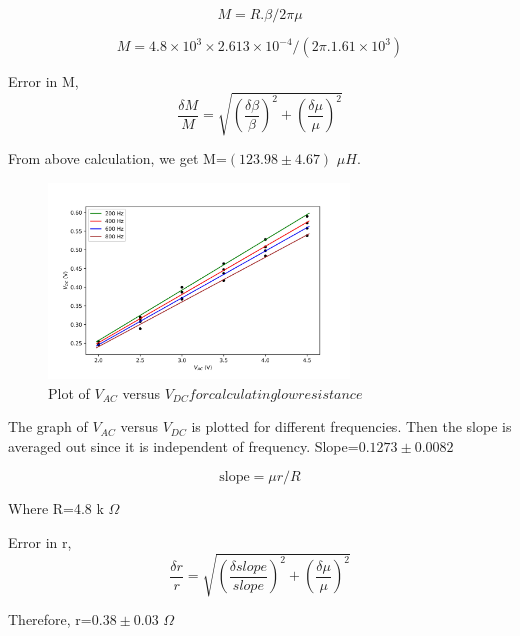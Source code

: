 \documentclass[a4paper, amsfonts, amssymb, amsmath, reprint, showkeys, nofootinbib, twoside]{revtex4-1}
\begin{document}
\begin{equation}
	M=R.\beta  /2 \pi \mu
\end{equation}

\begin{equation}
	M=4.8\times10^3\times2.613\times 10^{-4}/(2 \pi. 1.61\times10^3)
\end{equation}

Error in M,
\begin{equation}
\frac{\delta M}{M}= \sqrt{\left(\frac{\delta \beta}{\beta}\right)^2+\left(\frac{\delta \mu}{\mu}\right)^2}
\end{equation}

From above calculation, we get M=$(123.98\pm4.67)$ $\mu H$.

\begin{figure}[H]
	\centering
	\includegraphics[width=8cm]{f9} 
	\caption{Plot of $V_{AC}$ versus $V_{DC} for calculating low resistance$}
	\label{f9}
\end{figure}

The graph of $V_{AC}$ versus $V_{DC}$ is plotted for different frequencies. Then the slope is averaged out since it is independent of frequency. Slope=$0.1273\pm0.0082$

\begin{equation}
	\text{slope}=\mu r/R
\end{equation}

Where R=4.8 k $\Omega$ 

Error in r,
\begin{equation}
	\frac{\delta r}{r}= \sqrt{\left(\frac{\delta slope}{slope}\right)^2+\left(\frac{\delta \mu}{\mu}\right)^2}
\end{equation}

Therefore, r=$0.38\pm0.03$ $\Omega$
\end{document}
